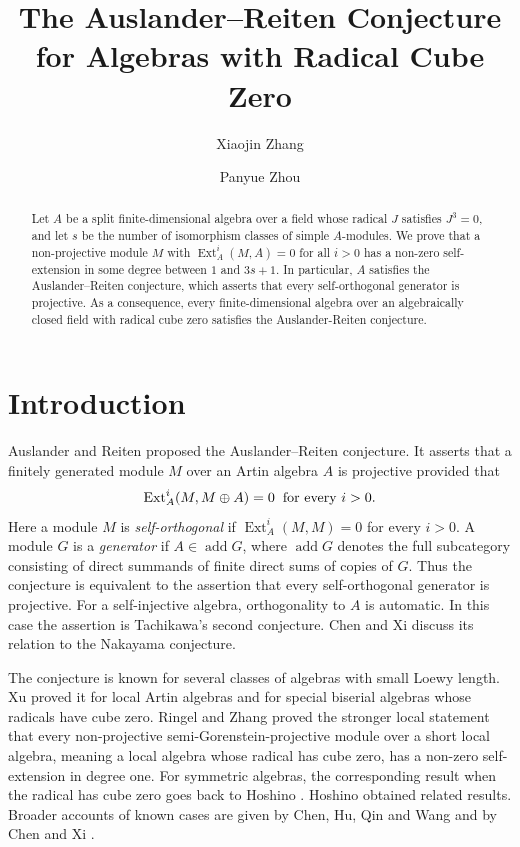 \documentclass[a4paper,reqno]{amsart}
\title[Self-extensions and radical cube zero]
{The Auslander--Reiten Conjecture for Algebras with Radical Cube Zero}
\author[X. Zhang]{Xiaojin Zhang}
\author[P. Zhou]{Panyue Zhou}
\numberwithin{equation}{section}
\newcommand{\Ext}{\operatorname{Ext}}
\newcommand{\add}{\operatorname{add}}
\begin{document}
\begin{abstract}
Let $A$ be a split finite-dimensional algebra over a field whose radical
$J$ satisfies $J^3=0$, and let $s$ be the number of isomorphism classes
of simple $A$-modules. We prove that a non-projective module $M$ with
$\Ext_A^i(M,A)=0$ for all $i>0$ has a non-zero self-extension in some
degree between $1$ and $3s+1$. In particular, $A$ satisfies the
Auslander--Reiten conjecture, which asserts that every self-orthogonal
generator is projective. As a consequence, every finite-dimensional
algebra over an algebraically closed field with radical cube zero satisfies the Auslander-Reiten conjecture.
\end{abstract}
\maketitle

\section{Introduction}

Auslander and Reiten \cite{AR75} proposed the Auslander--Reiten
conjecture. It asserts that a finitely generated module $M$ over an Artin
algebra $A$ is projective provided that
\begin{equation}\label{eq:ARC}
 \Ext_A^i(M,M\oplus A)=0\hspace{2mm}\text{for every }i>0.
\end{equation}
Here a module $M$ is \emph{self-orthogonal} if
$\Ext_A^i(M,M)=0$ for every $i>0$. A module $G$ is a \emph{generator}
if $A\in\add G$, where $\add G$ denotes the full subcategory consisting
of direct summands of finite direct sums of copies of $G$. Thus the
conjecture is equivalent to the assertion that every self-orthogonal
generator is projective. For a self-injective algebra, orthogonality to
$A$ is automatic. In this case the assertion is Tachikawa's second
conjecture. Chen and Xi \cite{ChenXi25} discuss its relation to the
Nakayama conjecture.

The conjecture is known for several classes of algebras with small
Loewy length. Xu \cite{Xu13,Xu15} proved it for local Artin algebras and
for special biserial algebras whose radicals have cube zero. Ringel and
Zhang \cite[Theorem~1.5]{RZ22} proved the stronger local statement that
every non-projective semi-Gorenstein-projective module over a short
local algebra, meaning a local algebra whose radical has cube zero, has
a non-zero self-extension in degree one. For symmetric
algebras, the corresponding result when the radical has cube zero goes
back to Hoshino \cite{Hoshino84}. Hoshino \cite{Hoshino89} obtained
related results. Broader accounts of known cases are given by Chen, Hu,
Qin and Wang \cite{CHQW23} and by Chen and Xi \cite{ChenXi25}.
\end{document}
